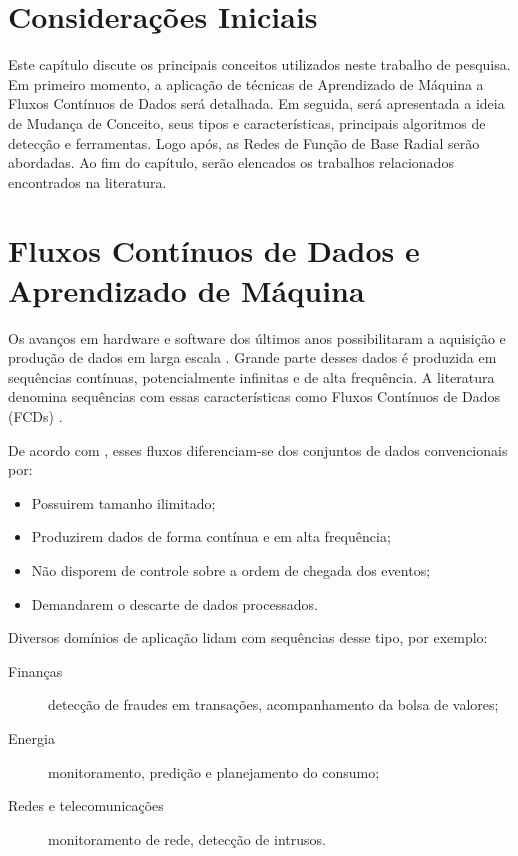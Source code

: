 \documentclass[qual, classic, a4paper]{ufbathesis}
\begin{document}
 \label{revisao_bibliografica}
\section{Considerações Iniciais}

Este capítulo discute os principais conceitos utilizados neste trabalho de pesquisa.
Em primeiro momento, a aplicação de técnicas de Aprendizado de Máquina a Fluxos Contínuos de Dados será detalhada.
Em seguida, será apresentada a ideia de Mudança de Conceito, seus tipos e características, principais algoritmos de detecção e ferramentas.
Logo após, as Redes de Função de Base Radial serão abordadas.
Ao fim do capítulo, serão elencados os trabalhos relacionados encontrados na literatura.

\section{Fluxos Contínuos de Dados e Aprendizado de Máquina}

Os avanços em hardware e software dos últimos anos possibilitaram a aquisição e produção de dados em larga escala \cite{Aggarwal:2003:FCE:1315451.1315460}.
Grande parte desses dados é produzida em sequências contínuas, potencialmente infinitas e de alta frequência.
A literatura denomina sequências com essas características como Fluxos Contínuos de Dados (FCDs) \cite{Aggarwal:2003:FCE:1315451.1315460, Gama:2010:KDD:1855075, GamaMCR04}.

De acordo com \cite{Babcock:2002:MID:543613.543615}, esses fluxos diferenciam-se dos conjuntos de dados convencionais por:
\begin{itemize}
    \item Possuirem tamanho ilimitado;
    \item Produzirem dados de forma contínua e em alta frequência;
    \item Não disporem de controle sobre a ordem de chegada dos eventos;
    \item Demandarem o descarte de dados processados.
\end{itemize}

Diversos domínios de aplicação lidam com sequências desse tipo, por exemplo:
\begin{description}
    \item[Finanças] detecção de fraudes em transações, acompanhamento da bolsa de valores;
    \item[Energia] monitoramento, predição e planejamento do consumo;
    \item[Redes e telecomunicações] monitoramento de rede, detecção de intrusos.
\end{description}
\end{document}
